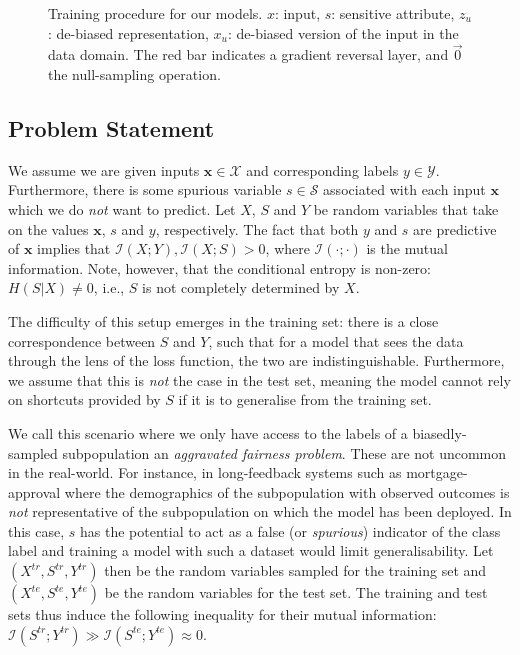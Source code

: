 \begin{figure}[tb]
{        \label{fig:cvae_diagram}
    }
    \hfill
    \caption{
        Training procedure for our models. $x$: input, $s$: sensitive attribute, $z_u$: de-biased representation, $x_u$: de-biased version of the input in the data domain.
        The red bar indicates a gradient reversal layer, and $\stackrel{\rightarrow}{0}$ the null-sampling operation.
    }%
    \label{fig:model-diagrams}
\end{figure}

\subsection{Problem Statement} %
\noindent We assume we are given inputs $\bm{x} \in \mathcal{X}$ and corresponding labels $y \in \mathcal{Y}$.
Furthermore, there is some spurious variable $s \in \mathcal{S}$ associated with each input $\bm{x}$ which we do \emph{not} want to predict. 
Let $X$, $S$ and $Y$ be random variables that take on the values $\bm{x}$, $s$ and $y$, respectively.
The fact that both $y$ and $s$ are predictive of $\bm{x}$ implies that $\mathcal{I}(X;Y), \mathcal{I}(X;S) > 0$, where $\mathcal{I}(\cdot ;\cdot)$ is the mutual information.
Note, however, that the conditional entropy is non-zero: $H(S|X) \neq 0$, i.e., $S$ is not completely determined by $X$.

The difficulty of this setup emerges in the training set: there is a close correspondence between $S$ and $Y$, such that for a model that sees the data through the lens of the loss function, the two are indistinguishable.
Furthermore, we assume that this is \emph{not} the case in the test set, meaning the model cannot rely on shortcuts provided by $S$ if it is to generalise from the training set.

We call this scenario where we only have access to the labels of a biasedly-sampled subpopulation
an \emph{aggravated fairness problem}.
These are not uncommon in the real-world.
For instance, in long-feedback systems such as mortgage-approval where the demographics of the subpopulation with observed outcomes is \emph{not} representative of the subpopulation on which the model has been deployed. 
In this case, $s$ has the potential to act as a false (or \emph{spurious}) indicator of the class label and
training a model with such a dataset would limit generalisability.
Let $(X^\mathit{tr}, S^\mathit{tr}, Y^\mathit{tr})$ then be the random variables sampled for the training set
and $(X^\mathit{te}, S^\mathit{te}, Y^\mathit{te})$ be the random variables for the test set.
The training and test sets thus induce the following inequality for their mutual information:
$\mathcal{I}(S^\mathit{tr}; Y^\mathit{tr}) \gg \mathcal{I}(S^\mathit{te}; Y^\mathit{te}) \approx 0$.

